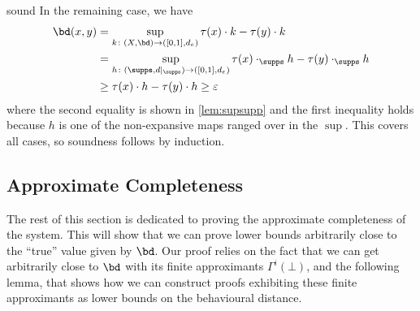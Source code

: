 \begin{proofappendix}{sound}
	In the remaining case, we have
	\begin{align*}
		\bd(x,y) & = \sup_{k \colon (X,\bd) \to ([0,1],d_e)} \tau(x) \cdot k - \tau(y) \cdot k                          \\
		         & = \sup_{h \colon (\supps,d|_\supps) \to ([0,1],d_e)} \tau(x) \cdot_\supps h - \tau(y) \cdot_\supps h \\
		         & \geq \tau(x) \cdot h - \tau(y) \cdot h \geq \varepsilon
	\end{align*}
	where the second equality is shown in \cref{lem:supsupp} and the first inequality holds because \(h\) is one of the non-expansive maps ranged over in the \(\sup\).
	This covers all cases, so soundness follows by induction.
\end{proofappendix}

\subsection{Approximate Completeness}\label{sec:appcomp}
The rest of this section is dedicated to proving the approximate completeness of the system.
This will show that we can prove lower bounds arbitrarily close to the ``true'' value given by \(\bd\).
Our proof relies on the fact that we can get arbitrarily close to \(\bd\) with its finite approximants \(\Gamma^i(\bot)\), and the following lemma, that shows how we can construct proofs exhibiting these finite approximants as lower bounds on the behavioural distance.

